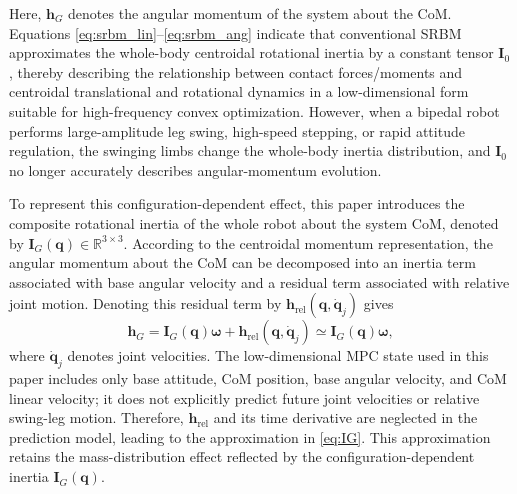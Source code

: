 \documentclass[5p,times]{elsarticle}
\begin{document}
Here, $\bm h_G$ denotes the angular momentum of the system about the CoM. Equations \eqref{eq:srbm_lin}--\eqref{eq:srbm_ang} indicate that conventional SRBM approximates the whole-body centroidal rotational inertia by a constant tensor $\bm I_0$, thereby describing the relationship between contact forces/moments and centroidal translational and rotational dynamics in a low-dimensional form suitable for high-frequency convex optimization. However, when a bipedal robot performs large-amplitude leg swing, high-speed stepping, or rapid attitude regulation, the swinging limbs change the whole-body inertia distribution, and $\bm I_0$ no longer accurately describes angular-momentum evolution.

To represent this configuration-dependent effect, this paper introduces the composite rotational inertia of the whole robot about the system CoM, denoted by $\bm I_G(\bm q)\in\mathbb{R}^{3\times3}$. According to the centroidal momentum representation, the angular momentum about the CoM can be decomposed into an inertia term associated with base angular velocity and a residual term associated with relative joint motion. Denoting this residual term by $\bm h_{\mathrm{rel}}(\bm q,\dot{\bm q}_j)$ gives
\begin{equation}
\bm h_G
=\bm I_G(\bm q)\bm\omega+\bm h_{\mathrm{rel}}(\bm q,\dot{\bm q}_j)
\simeq \bm I_G(\bm q)\bm\omega ,
\label{eq:IG}
\end{equation}
where $\dot{\bm q}_j$ denotes joint velocities. The low-dimensional MPC state used in this paper includes only base attitude, CoM position, base angular velocity, and CoM linear velocity; it does not explicitly predict future joint velocities or relative swing-leg motion. Therefore, $\bm h_{\mathrm{rel}}$ and its time derivative are neglected in the prediction model, leading to the approximation in \eqref{eq:IG}. This approximation retains the mass-distribution effect reflected by the configuration-dependent inertia $\bm I_G(\bm q)$.
\end{document}
